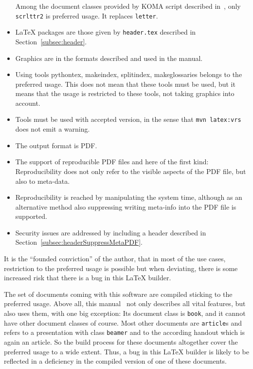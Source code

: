 \documentclass[a4paper,12pt,german,english]{book}
\begin{document}
\begin{itemize}
  Among the document classes provided by KOMA script 
  described in~\cite{KomaAnl23}, 
  only \texttt{scrlttr2} is preferred usage. 
  It replaces \texttt{letter}. 
  \item \LaTeX{} packages are those given by \texttt{header.tex} 
  described in Section~\ref{subsec:header}. 
  \item Graphics are in the formats described and used in the manual. 
  \item Using tools pythontex, makeindex, splitindex, makeglossaries 
  belongs to the preferred usage. 
  This does not mean that these tools must be used, 
  but it means that the usage is restricted to these tools, not taking graphics into account. 
  \item Tools must be used with accepted version, 
  in the sense that \texttt{mvn latex:vrs} does not emit a warning. 
  \item The output format is PDF\@. 
  \item The support of reproducible PDF files and here of the first kind: 
  Reproducibility does not only refer to the visible aspects of the PDF file, 
  but also to meta-data. 
  \item Reproducibility is reached by manipulating the system time, 
  although as an alternative method also suppressing writing meta-info into the PDF file is supported. 
  \item 
  Security issues are addressed by including a header described in Section~\ref{subsec:headerSuppressMetaPDF}. 
\end{itemize}


It is the ``founded conviction'' of the author, that in most of the use cases, 
restriction to the preferred usage is possible 
but when deviating, there is some increased risk 
that there is a bug in this \LaTeX{} builder. 

The set of documents coming with this software 
are compiled sticking to the preferred usage. 
Above all, this manual~\cite{LatexPlugin} not only describes all vital features, 
but also uses them, with one big exception: Its document class is \texttt{book}, 
and it cannot have other document classes of course. 
Most other documents are \texttt{article}s 
and~\cite{PresBeamer} refers to a presentation with class \texttt{beamer} 
and to the according handout which is again an article. 
So the build process for these documents altogether 
cover the preferred usage to a wide extent. 
Thus, a bug in this \LaTeX{} builder 
is likely to be reflected in a deficiency 
in the compiled version of one of these documents. 
\end{document}
